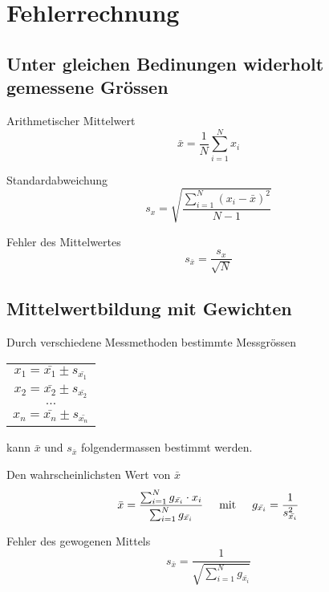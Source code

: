 \section{Fehlerrechnung}

\subsection{Unter gleichen Bedinungen widerholt gemessene Gr\"ossen}

Arithmetischer Mittelwert
\begin{equation}
    \bar{x} = \frac{1}{N} \sum_{i=1}^{N} x_i
\end{equation}

Standardabweichung
\begin{equation}
    s_x = \sqrt{ \frac{ \sum_{i=1}^{N} (x_i - \bar{x})^2 }{ N-1 } }
\end{equation}

Fehler des Mittelwertes
\begin{equation}
    s_{\bar{x}} = \frac{ s_x }{ \sqrt{N} }
\end{equation}


\subsection{Mittelwertbildung mit Gewichten}

Durch verschiedene Messmethoden bestimmte Messgr\"ossen

\begin{center}
    \begin{tabular}{c}
        $x_1 = \bar{x_1} \pm s_{\bar{x_1}}$ \\
        $x_2 = \bar{x_2} \pm s_{\bar{x_2}}$ \\
        $\ldots$                            \\
        $x_n = \bar{x_n} \pm s_{\bar{x_n}}$ \\
    \end{tabular}
\end{center}

kann $\bar{x}$ und $s_{\bar{x}}$ folgendermassen bestimmt werden.

Den wahrscheinlichsten Wert von $\bar{x}$
\begin{equation}
    \bar{x} = \frac{ \sum_{i=1}^{N} g_{\bar{x_i}} \cdot x_i }{ \sum_{i=1}^{N} g_{\bar{x_i}} }
    \hspace{5mm} \textrm{mit} \hspace{5mm}
    g_{\bar{x_i}} = \frac{1}{s_{\bar{x_i}}^2}
\end{equation}

Fehler des gewogenen Mittels
\begin{equation}
    s_{\bar{x}} = \frac{1}{\sqrt{\sum_{i=1}^{N} g_{\bar{x_i}}}}
\end{equation}


